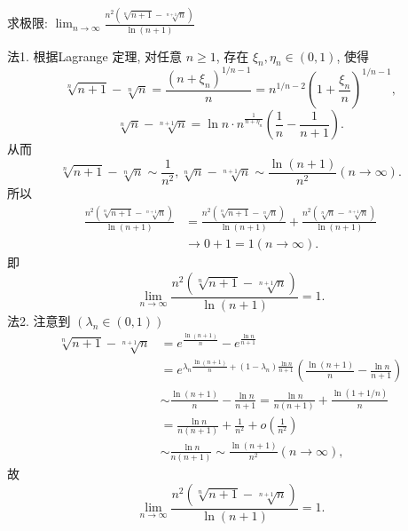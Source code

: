 \documentclass[color=green,titlestyle=hang]{elegantbook}%
\begin{document}
\begin{exercise}
求极限: $\lim_{n\to\infty}\frac{n^2(\sqrt[n]{n+1}-\sqrt[n+1]{n})}{\ln (n+1)}$
\end{exercise}\begin{solution}
法1. 根据Lagrange 定理, 对任意 $n\geq 1$, 存在 $\xi_n,\eta_n\in (0,1)$, 使得
\[\sqrt[n]{n+1}-\sqrt[n]{n}=\frac{(n+\xi_n)^{1/n-1}}{n}=n^{1/n-2}(1+\frac{\xi_n}{n})^{1/n-1},\]
\[\sqrt[n]{n}-\sqrt[n+1]{n}=\ln n\cdot n^{\frac{1}{n+\eta_n}}\left(\frac{1}{n}-\frac{1}{n+1}\right).\]
从而
\[\sqrt[n]{n+1}-\sqrt[n]{n}\sim\frac{1}{n^2}, \sqrt[n]{n}-\sqrt[n+1]{n}\sim \frac{\ln (n+1)}{n^2}(n\to\infty).\]
所以\begin{align*}
\frac{n^2(\sqrt[n]{n+1}-\sqrt[n+1]{n})}{\ln (n+1)}&=\frac{n^2(\sqrt[n]{n+1}-\sqrt[n]{n})}{\ln (n+1)} +\frac{n^2(\sqrt[n]{n}-\sqrt[n+1]{n})}{\ln(n+1)}\\
&\to 0+1=1(n\to\infty).
\end{align*}
即\[\lim_{n\to\infty}\frac{n^2(\sqrt[n]{n+1}-\sqrt[n+1]{n})}{\ln (n+1)}=1.\]
法2. 注意到 $(\lambda_n\in (0,1))$
\[\begin{array}{rl}\sqrt[n]{n+1}-\sqrt[n+1]{n}
&=e^{\frac{\ln (n+1)}{n}}-e^{\frac{\ln n}{n+1}}\\ 
&=e^{\lambda_n \frac{\ln (n+1)}{n}+(1-\lambda_n )\frac{\ln n}{n+1}} (\frac{\ln (n+1)}{n}-\frac{\ln n}{n+1})\\ 
&\sim \frac{\ln (n+1)}{n}-\frac{\ln n}{n+1}=\frac{\ln n}{n(n+1)}+\frac{\ln (1+1/n)}{n}\\ 
&=\frac{\ln n}{n(n+1)}+\frac{1}{n^2}+o\left(\frac{1}{n^2}\right)\\ 
&\sim \frac{\ln n}{n(n+1)}\sim\frac{\ln (n+1)}{n^2}(n\to\infty),\end{array}\]
故\[\lim_{n\to\infty}\frac{n^2(\sqrt[n]{n+1}-\sqrt[n+1]{n})}{\ln (n+1)}=1.\]
\end{solution}
\end{document}
